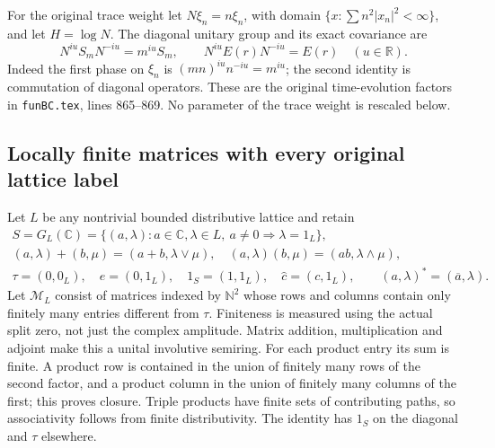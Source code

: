 For the original trace weight let $N\xi_n=n\xi_n$, with
domain $\{x:\sum n^2|x_n|^2<\infty\}$, and let
$H=\log N$. The diagonal unitary group and its exact covariance
are
\begin{equation}\tag{HCR6}
 N^{iu}S_mN^{-iu}=m^{iu}S_m,\qquad
 N^{iu}E(r)N^{-iu}=E(r)\quad(u\in\mathbb R).
\end{equation}
Indeed the first phase on $\xi_n$ is $(mn)^{iu}n^{-iu}=m^{iu}$;
the second identity is commutation of diagonal operators.
These are the original time-evolution factors in
\texttt{funBC.tex}, lines 865--869. No parameter of the trace
weight is rescaled below.

\subsection{Locally finite matrices with every original lattice label}

Let $L$ be any nontrivial bounded distributive lattice and retain
\begin{equation}\tag{HCR7}
\begin{gathered}
 S=G_L(\mathbb C)=\{(a,\lambda):a\in\mathbb C,\lambda\in L,
                               \ a\ne0\Rightarrow\lambda=1_L\},\\
 (a,\lambda)+(b,\mu)=(a+b,\lambda\vee\mu),\quad
 (a,\lambda)(b,\mu)=(ab,\lambda\wedge\mu),\\
 \tau=(0,0_L),\quad e=(0,1_L),\quad 1_S=(1,1_L),\quad
 \widehat c=(c,1_L),\qquad(a,\lambda)^*=(\overline a,\lambda).
\end{gathered}
\end{equation}
Let $\mathscr M_L$ consist of matrices indexed by $\mathbb N^2$
whose rows and columns contain only finitely many entries different
from $\tau$. Finiteness is measured using the actual split zero,
not just the complex amplitude. Matrix addition, multiplication
and adjoint make this a unital involutive semiring. For each
product entry its sum is finite. A product row is contained in
the union of finitely many rows of the second factor, and a
product column in the union of finitely many columns of the
first; this proves closure. Triple products have finite sets
of contributing paths, so associativity follows from finite
distributivity. The identity has $1_S$ on the diagonal and
$\tau$ elsewhere.

